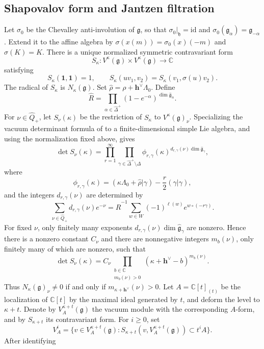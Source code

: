 \documentclass[11pt,a4paper]{amsart}
\newcommand{\CC}{\mathbb C}
\theoremstyle{plain}
\numberwithin{equation}{section}
\def\geq{\geqslant}
\begin{document}
\subsection{Shapovalov form and Jantzen filtration}
Let $\sigma_0$ be the Chevalley anti-involution of $\mathfrak g$, so that
$\sigma_0|_{\mathfrak h}=\mathrm{id}$ and
$\sigma_0(\mathfrak g_\alpha)=\mathfrak g_{-\alpha}$. Extend it to the
affine algebra by
\(\sigma(x(m))=\sigma_0(x)(-m)\) and \(\sigma(K)=K\).
There is a unique normalized symmetric contravariant form\cite{shapovalov1972bilinear,KK79}
\[
S_\kappa:V^\kappa(\mathfrak g)\times V^\kappa(\mathfrak g)\longrightarrow\CC
\]
satisfying
\[
S_\kappa(\mathbf1,\mathbf1)=1,
\qquad
S_\kappa(uv_1,v_2)=S_\kappa(v_1,\sigma(u)v_2).
\]
The radical of \(S_\kappa\) is \(N_\kappa(\mathfrak g)\). Set
\(\widehat\rho=\rho+\mathbf{h}^\vee\Lambda_0\). Define
\[
\widehat R
=\prod_{\alpha\in\widehat\Delta^+}
(1-e^{-\alpha})^{\dim\widehat{\mathfrak g}_\alpha}.
\]
For $\nu\in\widehat Q_+$, let $S_\nu(\kappa)$ be the restriction of
$S_\kappa$ to $V^\kappa(\mathfrak g)_\nu$. Specializing the vacuum determinant formula of
\cite{GK07} to a finite-dimensional
simple Lie algebra, and using the normalization fixed above, gives
\[
\det S_\nu(\kappa)
=\prod_{r=1}^{\infty}
\prod_{\gamma\in\widehat\Delta^+\setminus\Delta}
\phi_{r,\gamma}(\kappa)^{
d_{r,\gamma}(\nu)\dim\widehat{\mathfrak g}_\gamma},
\]
where
\[
\phi_{r,\gamma}(\kappa)
=(\kappa\Lambda_0+\widehat\rho|\gamma)
-\frac r2(\gamma|\gamma),
\]
and the integers $d_{r,\gamma}(\nu)$ are determined by
\[
\sum_{\nu\in\widehat Q_+}d_{r,\gamma}(\nu)e^{-\nu}
=\widehat R^{-1}
\sum_{w\in W}(-1)^{\ell(w)}e^{w\circ(-r\gamma)}.
\]
For fixed \(\nu\), only finitely many exponents
\(d_{r,\gamma}(\nu)\dim\widehat{\mathfrak g}_\gamma\) are nonzero.
Hence there is a nonzero constant $C_\nu$ and there are nonnegative integers $m_b(\nu)$,
only finitely many of which are nonzero, such that
\[
\det S_\nu(\kappa)
=C_\nu
\prod_{\substack{b\in\CC\\m_b(\nu)>0}}
(\kappa+\mathbf{h}^\vee-b)^{m_b(\nu)}.
\]
Thus
\(N_\kappa(\mathfrak g)_\nu\ne0\) if and only if
\(m_{\kappa+\mathbf{h}^\vee}(\nu)>0\).
Let $A=\CC[t]_{(t)}$ be the localization of ${\mathbb C}[t]$ by the maximal ideal  generated by $t$, and deform the level to
$\kappa+t$. Denote by $V_A^{\kappa+t}(\mathfrak g)$ 
the  vacuum module with the corresponding $A$-form, 
and by
$S_{\kappa+t}$ its contravariant form. For $i\geq0$, set
\[
V_A^i
=\{v\in V_A^{\kappa+t}(\mathfrak g):
S_{\kappa+t}(v,V_A^{\kappa+t}(\mathfrak g))
\subset t^iA\}.
\]
After identifying
\end{document}
